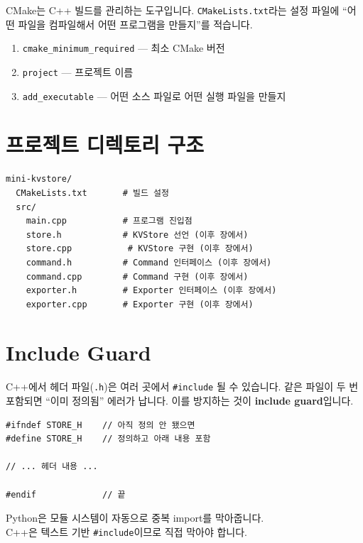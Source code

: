 \documentclass[11pt,a4paper]{book}
\newcommand{\file}[1]{\texttt{#1}}
\newcommand{\code}[1]{\texttt{#1}}
\begin{document}
CMake는 C++ 빌드를 관리하는 도구입니다. \file{CMakeLists.txt}라는 설정 파일에 ``어떤 파일을 컴파일해서 어떤 프로그램을 만들지''를 적습니다.

\begin{conceptbox}[title={CMake의 핵심 세 줄}]
\begin{enumerate}
\item \code{cmake\_minimum\_required} — 최소 CMake 버전
\item \code{project} — 프로젝트 이름
\item \code{add\_executable} — 어떤 소스 파일로 어떤 실행 파일을 만들지
\end{enumerate}
\end{conceptbox}

\section{프로젝트 디렉토리 구조}

\begin{lstlisting}[style=shell,numbers=none]
mini-kvstore/
  CMakeLists.txt       # 빌드 설정
  src/
    main.cpp           # 프로그램 진입점
    store.h            # KVStore 선언 (이후 장에서)
    store.cpp           # KVStore 구현 (이후 장에서)
    command.h          # Command 인터페이스 (이후 장에서)
    command.cpp        # Command 구현 (이후 장에서)
    exporter.h         # Exporter 인터페이스 (이후 장에서)
    exporter.cpp       # Exporter 구현 (이후 장에서)
\end{lstlisting}

\section{Include Guard}

C++에서 헤더 파일(\file{.h})은 여러 곳에서 \code{\#include} 될 수 있습니다. 같은 파일이 두 번 포함되면 ``이미 정의됨'' 에러가 납니다. 이를 방지하는 것이 \textbf{include guard}입니다.

\begin{lstlisting}[style=cpp]
#ifndef STORE_H    // 아직 정의 안 됐으면
#define STORE_H    // 정의하고 아래 내용 포함

// ... 헤더 내용 ...

#endif             // 끝
\end{lstlisting}

\begin{pythonbox}
Python은 모듈 시스템이 자동으로 중복 import를 막아줍니다.\\
C++은 텍스트 기반 \code{\#include}이므로 직접 막아야 합니다.
\end{pythonbox}
\end{document}
